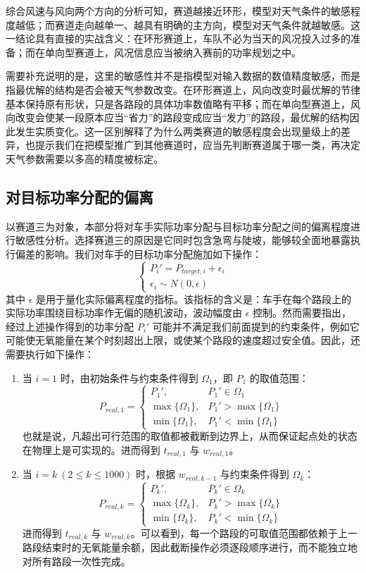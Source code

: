 \documentclass[11pt,a4paper]{ctexart}
\begin{document}
综合风速与风向两个方向的分析可知，赛道越接近环形，模型对天气条件的敏感程度越低；而赛道走向越单一、越具有明确的主方向，模型对天气条件就越敏感。这一结论具有直接的实战含义：在环形赛道上，车队不必为当天的风况投入过多的准备；而在单向型赛道上，风况信息应当被纳入赛前的功率规划之中。

需要补充说明的是，这里的敏感性并不是指模型对输入数据的数值精度敏感，而是指最优解的结构是否会被天气参数改变。在环形赛道上，风向改变时最优解的节律基本保持原有形状，只是各路段的具体功率数值略有平移；而在单向型赛道上，风向改变会使某一段原本应当“省力”的路段变成应当“发力”的路段，最优解的结构因此发生实质变化。这一区别解释了为什么两类赛道的敏感程度会出现量级上的差异，也提示我们在把模型推广到其他赛道时，应当先判断赛道属于哪一类，再决定天气参数需要以多高的精度被标定。

\subsection{对目标功率分配的偏离}

以赛道三为对象，本部分将对车手实际功率分配与目标功率分配之间的偏离程度进行敏感性分析。选择赛道三的原因是它同时包含急弯与陡坡，能够较全面地暴露执行偏差的影响。我们对车手的目标功率分配施加如下操作：
\[
\begin{cases}
P_i'=P_{target,i}+\epsilon_i\\
\epsilon_i\sim N(0,\epsilon)
\end{cases}
\]
其中 $\epsilon$ 是用于量化实际偏离程度的指标。该指标的含义是：车手在每个路段上的实际功率围绕目标功率作无偏的随机波动，波动幅度由 $\epsilon$ 控制。然而需要指出，经过上述操作得到的功率分配 $P_i'$ 可能并不满足我们前面提到的约束条件，例如它可能使无氧能量在某个时刻超出上限，或使某个路段的速度超过安全值。因此，还需要执行如下操作：

\begin{enumerate}
\item 当 $i=1$ 时，由初始条件与约束条件得到 $\Omega_1$，即 $P_1$ 的取值范围：
\[
P_{real,1}=
\begin{cases}
P_1', & P_1'\in\Omega_1\\
\max\{\Omega_1\}, & P_1'>\max\{\Omega_1\}\\
\min\{\Omega_1\}, & P_1'<\min\{\Omega_1\}
\end{cases}
\]
也就是说，凡超出可行范围的取值都被截断到边界上，从而保证起点处的状态在物理上是可实现的。进而得到 $t_{real,1}$ 与 $w_{real,1}$。

\item 当 $i=k\ (2\le k\le 1000)$ 时，根据 $w_{real,k-1}$ 与约束条件得到 $\Omega_k$：
\[
P_{real,k}=
\begin{cases}
P_k', & P_k'\in\Omega_k\\
\max\{\Omega_k\}, & P_k'>\max\{\Omega_k\}\\
\min\{\Omega_k\}, & P_k'<\min\{\Omega_k\}
\end{cases}
\]
进而得到 $t_{real,k}$ 与 $w_{real,k}$。可以看到，每一个路段的可取值范围都依赖于上一路段结束时的无氧能量余额，因此截断操作必须逐段顺序进行，而不能独立地对所有路段一次性完成。
\end{enumerate}
\end{document}
